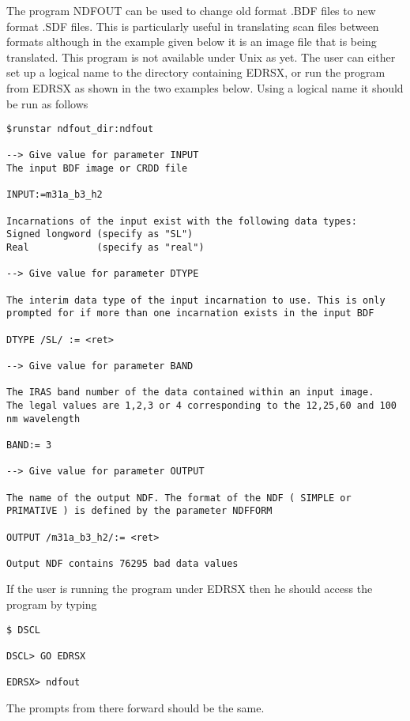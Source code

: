 The program NDFOUT can be used to change old format .BDF files to new format
.SDF files. This is particularly useful in translating scan files between 
formats although in the example given below it is an image file that is being
translated. This program is not available under Unix as yet. The user can either
set up a logical name to the directory containing EDRSX, or run the program from
EDRSX as shown in the two examples below. Using a logical name it should be run
as follows
\begin{small}
\begin{verbatim}
$runstar ndfout_dir:ndfout

--> Give value for parameter INPUT
The input BDF image or CRDD file

INPUT:=m31a_b3_h2

Incarnations of the input exist with the following data types:
Signed longword (specify as "SL")
Real            (specify as "real")

--> Give value for parameter DTYPE

The interim data type of the input incarnation to use. This is only
prompted for if more than one incarnation exists in the input BDF

DTYPE /SL/ := <ret>

--> Give value for parameter BAND

The IRAS band number of the data contained within an input image.
The legal values are 1,2,3 or 4 corresponding to the 12,25,60 and 100 nm wavelength

BAND:= 3

--> Give value for parameter OUTPUT

The name of the output NDF. The format of the NDF ( SIMPLE or
PRIMATIVE ) is defined by the parameter NDFFORM

OUTPUT /m31a_b3_h2/:= <ret>

Output NDF contains 76295 bad data values
\end{verbatim}
\end{small}

If the user is running the program under EDRSX then he should access the program
by typing
\begin{small}
\begin{verbatim}
$ DSCL

DSCL> GO EDRSX

EDRSX> ndfout
\end{verbatim}
\end{small}

The prompts from there forward should be the same.

